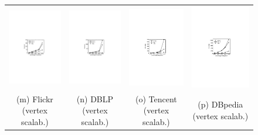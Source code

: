 \begin{figure}[htp]
\begin{tabular}{c c c c}
  \begin{minipage}{3.725cm}
	\includegraphics[width=3.725cm]{figures/flickr-keyword}
  \end{minipage}
  &
  \begin{minipage}{3.725cm}
	\includegraphics[width=3.725cm]{figures/dblp-keyword}
  \end{minipage}
  &
  \begin{minipage}{3.725cm}
	\includegraphics[width=3.725cm]{figures/tencent-keyword}
  \end{minipage}
  &
  \begin{minipage}{3.725cm}
	\includegraphics[width=3.725cm]{figures/dbpedia-keyword}
  \end{minipage}
  \\
  \small (m) Flickr (vertex scalab.)
  &
  \small (n) DBLP (vertex scalab.)
  &
  \small (o) Tencent (vertex scalab.)
  &
  \small (p) DBpedia (vertex scalab.)
  \\


\end{tabular}
\end{figure}
